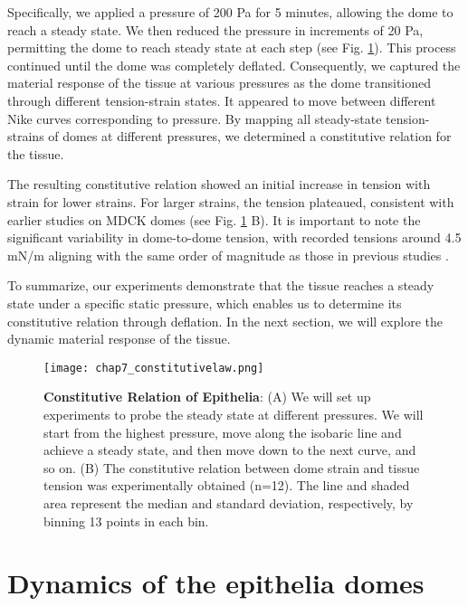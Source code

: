 Specifically, we applied a pressure of 200 Pa for 5 minutes, allowing
the dome to reach a steady state. We then reduced the pressure in
increments of 20 Pa, permitting the dome to reach steady state at each
step (see Fig. \ref{fig_7_5}). This process continued
until the dome was completely deflated. Consequently, we captured the
material response of the tissue at various pressures as the dome
transitioned through different tension-strain states. It appeared to
move between different Nike curves corresponding to pressure. By mapping
all steady-state tension-strains of domes at different pressures, we
determined a constitutive relation for the tissue.

The resulting constitutive relation showed an initial increase in
tension with strain for lower strains. For larger strains, the tension
plateaued, consistent with earlier studies on MDCK domes (see Fig. \ref{fig_7_5} B). It is important to note the
significant variability in dome-to-dome tension, with recorded tensions
around 4.5 mN/m aligning with the same order of magnitude as those in
previous studies \cite{latorre2018,marin-llaurado2022}.

To summarize, our experiments demonstrate that the tissue reaches a
steady state under a specific static pressure, which enables us to
determine its constitutive relation through deflation. In the next
section, we will explore the dynamic material response of the tissue.


\begin{figure}
	\centering
	\texttt{[image: chap7\_constitutivelaw.png]}
	\caption{\label{fig_7_5} \textbf{Constitutive Relation of Epithelia}: (A) We will set up experiments to probe the steady state at different pressures. We will start from the highest pressure, move along the isobaric line and achieve a steady state, and then move down to the next curve, and so on.	(B) The constitutive relation between dome strain and tissue tension was experimentally obtained (n=12). The line and shaded area represent the median and standard deviation, respectively, by binning 13 points in each bin.
	}
\end{figure}


\hypertarget{dynamics-of-the-epithelia-domes}{%
	\section{Dynamics of the epithelia
		domes}\label{dynamics-of-the-epithelia-domes}}

